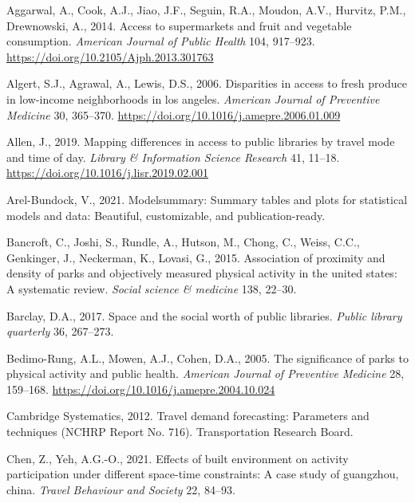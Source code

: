 \documentclass[3p, authoryear, review]{elsarticle} %
\newlength{\cslhangindent}
\newenvironment{CSLReferences}[2] %
 {%
  \setlength{\parindent}{0pt}
  \ifodd #1 \everypar{\setlength{\hangindent}{\cslhangindent}}\ignorespaces\fi
  \ifnum #2 > 0
  \setlength{\parskip}{#2\baselineskip}
  \fi
 }%
 {}
\begin{document}
\hypertarget{refs}{}
\begin{CSLReferences}{1}{0}
\leavevmode{}%
Aggarwal, A., Cook, A.J., Jiao, J.F., Seguin, R.A., Moudon, A.V., Hurvitz, P.M., Drewnowski, A., 2014. Access to supermarkets and fruit and vegetable consumption. \emph{American Journal of Public Health} 104, 917--923. \url{https://doi.org/10.2105/Ajph.2013.301763}

\leavevmode{}%
Algert, S.J., Agrawal, A., Lewis, D.S., 2006. Disparities in access to fresh produce in low-income neighborhoods in los angeles. \emph{American Journal of Preventive Medicine} 30, 365--370. \url{https://doi.org/10.1016/j.amepre.2006.01.009}

\leavevmode{}%
Allen, J., 2019. Mapping differences in access to public libraries by travel mode and time of day. \emph{Library \& Information Science Research} 41, 11--18. \url{https://doi.org/10.1016/j.lisr.2019.02.001}

\leavevmode{}%
Arel-Bundock, V., 2021. Modelsummary: Summary tables and plots for statistical models and data: Beautiful, customizable, and publication-ready.

\leavevmode{}%
Bancroft, C., Joshi, S., Rundle, A., Hutson, M., Chong, C., Weiss, C.C., Genkinger, J., Neckerman, K., Lovasi, G., 2015. Association of proximity and density of parks and objectively measured physical activity in the united states: A systematic review. \emph{Social science \& medicine} 138, 22--30.

\leavevmode{}%
Barclay, D.A., 2017. Space and the social worth of public libraries. \emph{Public library quarterly} 36, 267--273.

\leavevmode{}%
Bedimo-Rung, A.L., Mowen, A.J., Cohen, D.A., 2005. The significance of parks to physical activity and public health. \emph{American Journal of Preventive Medicine} 28, 159--168. \url{https://doi.org/10.1016/j.amepre.2004.10.024}

\leavevmode{}%
Cambridge Systematics, 2012. Travel demand forecasting: Parameters and techniques (NCHRP Report No. 716). Transportation Research Board.

\leavevmode{}%
Chen, Z., Yeh, A.G.-O., 2021. Effects of built environment on activity participation under different space-time constraints: A case study of guangzhou, china. \emph{Travel Behaviour and Society} 22, 84--93.


\end{CSLReferences}
\end{document}
